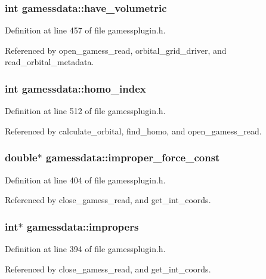 \subsubsection{\setlength{\rightskip}{0pt plus 5cm}int gamessdata::have\_\-volumetric}\label{structgamessdata_m59}




Definition at line 457 of file gamessplugin.h.

Referenced by open\_\-gamess\_\-read, orbital\_\-grid\_\-driver, and read\_\-orbital\_\-metadata.
\subsubsection{\setlength{\rightskip}{0pt plus 5cm}int gamessdata::homo\_\-index}\label{structgamessdata_m71}




Definition at line 512 of file gamessplugin.h.

Referenced by calculate\_\-orbital, find\_\-homo, and open\_\-gamess\_\-read.
\subsubsection{\setlength{\rightskip}{0pt plus 5cm}double$\ast$ gamessdata::improper\_\-force\_\-const}\label{structgamessdata_m52}




Definition at line 404 of file gamessplugin.h.

Referenced by close\_\-gamess\_\-read, and get\_\-int\_\-coords.
\subsubsection{\setlength{\rightskip}{0pt plus 5cm}int$\ast$ gamessdata::impropers}\label{structgamessdata_m47}




Definition at line 394 of file gamessplugin.h.

Referenced by close\_\-gamess\_\-read, and get\_\-int\_\-coords.
